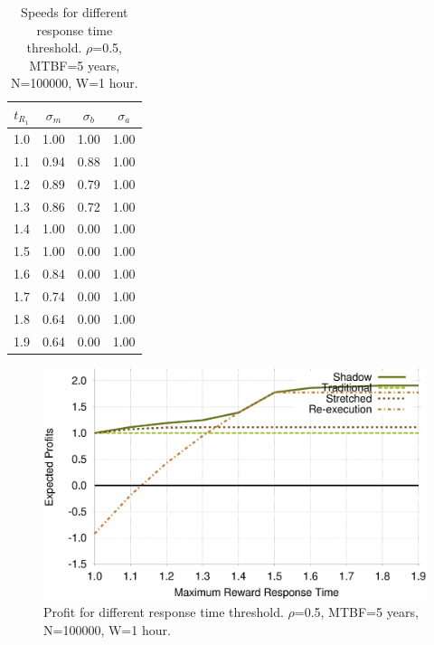 \begin{table}[!h]\small
	\caption{Speeds for different response time threshold. $\rho$=0.5, MTBF=5 years, N=100000, W=1 hour.}
	\centering
		\begin{tabular}{|c|c|c|c|}
		\hline
		$t_{R_1}$ & $\sigma_m$ & $\sigma_b$ & $\sigma_a$ \\
		\hline
		1.0	&	1.00 & 	1.00 &	1.00 \\
		\hline
		1.1	&	0.94 &	0.88 &	1.00 \\
		\hline
		1.2	&	0.89 &	0.79 &	1.00 \\
		\hline
		1.3	&	0.86 &	0.72 &	1.00 \\
		\hline
		1.4	&	1.00 &	0.00 &	1.00 \\
		\hline
		1.5	&	1.00 &	0.00 &	1.00 \\
		\hline
		1.6	&	0.84 &	0.00 &	1.00 \\
		\hline
		1.7	&	0.74 &	0.00 &	1.00 \\
		\hline
		1.8	&	0.64 &	0.00 &	1.00 \\
		\hline
		1.9	&	0.64 &	0.00 &	1.00 \\
		\hline
		\end{tabular}
	\label{tbl:t}
\end{table}

\begin{figure}[!h]	
	\begin{center}
		\includegraphics[width=\columnwidth]{diagrams/t_profit.eps}
	\end{center}
	\caption{Profit for different response time threshold. $\rho$=0.5, MTBF=5 years, N=100000, W=1 hour.}
	\label{fig:t}
\end{figure}


